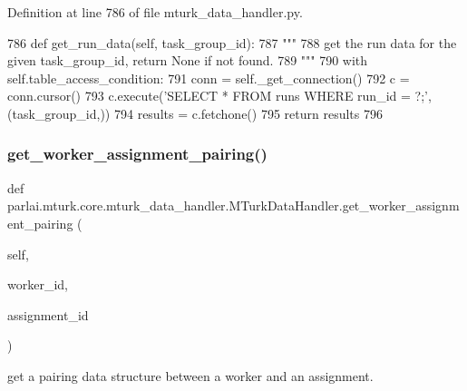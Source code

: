 Definition at line 786 of file mturk\+\_\+data\+\_\+handler.\+py.


\begin{DoxyCode}
786     \textcolor{keyword}{def }get\_run\_data(self, task\_group\_id):
787         \textcolor{stringliteral}{"""}
788 \textcolor{stringliteral}{        get the run data for the given task\_group\_id, return None if not found.}
789 \textcolor{stringliteral}{        """}
790         with self.table\_access\_condition:
791             conn = self.\_get\_connection()
792             c = conn.cursor()
793             c.execute(\textcolor{stringliteral}{'SELECT * FROM runs WHERE run\_id = ?;'}, (task\_group\_id,))
794             results = c.fetchone()
795             \textcolor{keywordflow}{return} results
796 
\end{DoxyCode}
\mbox{\label{classparlai_1_1mturk_1_1core_1_1mturk__data__handler_1_1MTurkDataHandler_a91ba12c1bce3f3af8b760eaf1384a8b9}} 
\subsubsection{\texorpdfstring{get\+\_\+worker\+\_\+assignment\+\_\+pairing()}{get\_worker\_assignment\_pairing()}}
{\footnotesize\ttfamily def parlai.\+mturk.\+core.\+mturk\+\_\+data\+\_\+handler.\+M\+Turk\+Data\+Handler.\+get\+\_\+worker\+\_\+assignment\+\_\+pairing (\begin{DoxyParamCaption}\item[{}]{self,  }\item[{}]{worker\+\_\+id,  }\item[{}]{assignment\+\_\+id }\end{DoxyParamCaption})}

\begin{DoxyVerb}get a pairing data structure between a worker and an assignment.
\end{DoxyVerb}
 

